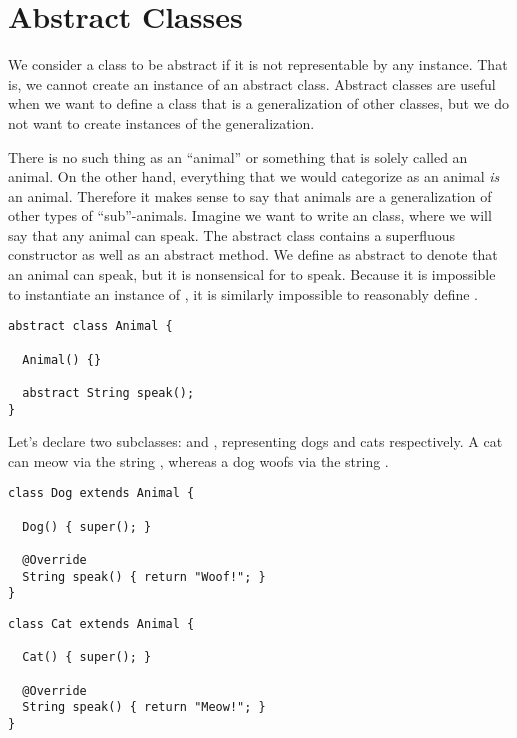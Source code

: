\section{Abstract Classes}

We consider a class to be abstract if it is not representable by any instance. That is, we cannot create an instance of an abstract class. Abstract classes are useful when we want to define a class that is a generalization of other classes, but we do not want to create instances of the generalization.

 There is no such thing as an ``animal'' or something that is solely called an animal. On the other hand, everything that we would categorize as an animal \emph{is} an animal. Therefore it makes sense to say that animals are a generalization of other types of ``sub''-animals. Imagine we want to write an  class, where we will say that any animal can speak. The abstract class contains a superfluous constructor as well as an abstract  method. We define  as abstract to denote that an animal can speak, but it is nonsensical for  to speak. Because it is impossible to instantiate an instance of , it is similarly impossible to reasonably define .

\enlargethispage{-2\baselineskip}
\begin{lstlisting}[language=MyJava]
abstract class Animal {

  Animal() {} 

  abstract String speak();
}
\end{lstlisting}

Let's declare two subclasses:  and , representing dogs and cats respectively. A cat can meow via the string , whereas a dog woofs via the string . 

\begin{lstlisting}[language=MyJava]
class Dog extends Animal {

  Dog() { super(); }

  @Override
  String speak() { return "Woof!"; }
}
\end{lstlisting}

\begin{lstlisting}[language=MyJava]
class Cat extends Animal {

  Cat() { super(); }

  @Override
  String speak() { return "Meow!"; }
}
\end{lstlisting}

